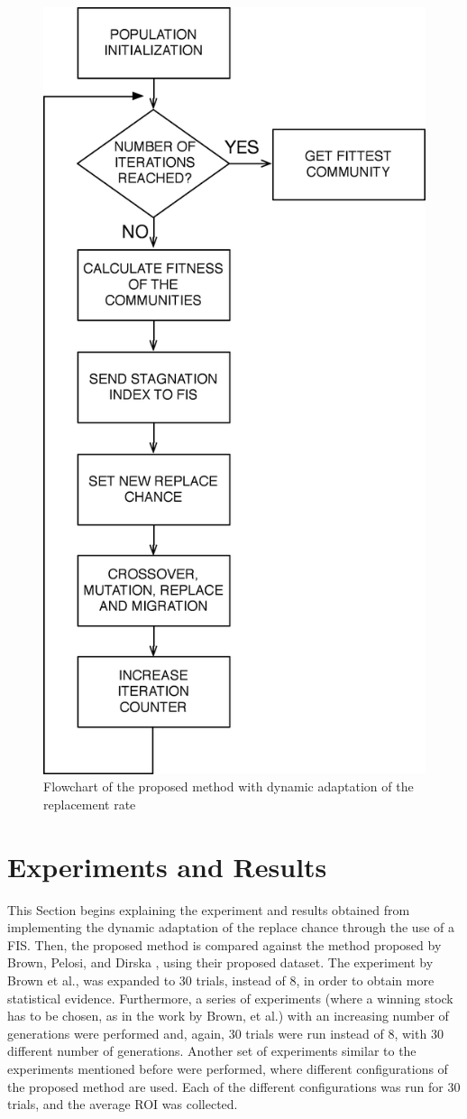 \documentclass[a4paper,twoside]{article}
\begin{document}
\begin{figure}[h!]
\begin{center}
\includegraphics[width=0.70\columnwidth]{figures/flowchart-with/flowchart-with}
\caption{{\label{flowchart-with-dynamic}Flowchart of the proposed
    method with dynamic adaptation of the replacement rate%
}}
\end{center}
\end{figure}

\section{Experiments and Results}
\label{experiments-and-results}

This Section begins explaining the experiment and results obtained
from implementing the dynamic adaptation of the replace chance through
the use of a FIS. Then, the proposed method is compared against the
method proposed by Brown, Pelosi, and Dirska \cite{brown2013dynamic},
using their proposed dataset. The experiment by Brown et al., was
expanded to 30 trials, instead of 8, in order to obtain more
statistical evidence. Furthermore, a series of experiments (where a
winning stock has to be chosen, as in the work by Brown, et al.) with
an increasing number of generations were performed and, again, 30
trials were run instead of 8, with 30 different number of
generations. Another set of experiments similar to the experiments
mentioned before were performed, where different configurations of the
proposed method are used. Each of the different configurations was run
for 30 trials, and the average ROI was collected. 
\end{document}
